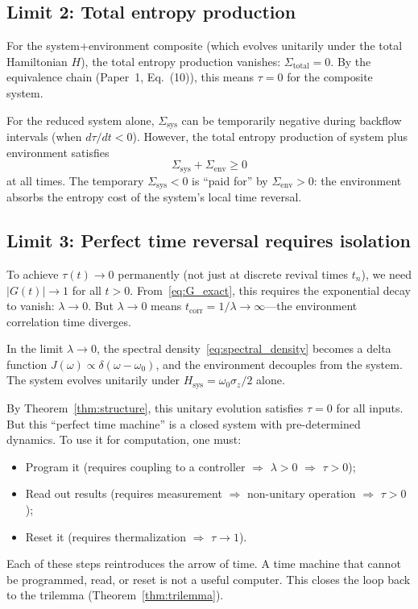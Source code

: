 \documentclass[prl,twocolumn,superscriptaddress,longbibliography]{revtex4-2}
\newcommand{\tauasym}{\tau}
\begin{document}
\subsection{Limit 2: Total entropy production}

For the system+environment composite (which evolves unitarily under
the total Hamiltonian $H$), the total entropy production vanishes:
$\Sigma_{\mathrm{total}} = 0$.  By the equivalence chain
(Paper~1, Eq.~(10)), this means $\tauasym = 0$ for the composite
system.

For the reduced system alone, $\Sigma_{\mathrm{sys}}$ can be
temporarily negative during backflow intervals (when $d\tauasym/dt < 0$).
However, the total entropy production of system plus environment
satisfies
\begin{equation}
\Sigma_{\mathrm{sys}} + \Sigma_{\mathrm{env}} \geq 0
\end{equation}
at all times.  The temporary $\Sigma_{\mathrm{sys}} < 0$ is
``paid for'' by $\Sigma_{\mathrm{env}} > 0$: the environment
absorbs the entropy cost of the system's local time reversal.

\subsection{Limit 3: Perfect time reversal requires isolation}

To achieve $\tauasym(t) \to 0$ permanently (not just at discrete
revival times $t_n$), we need $|G(t)| \to 1$ for all $t > 0$.
From~\eqref{eq:G_exact}, this requires the exponential decay to
vanish: $\lambda \to 0$.  But $\lambda \to 0$ means
$t_{\mathrm{corr}} = 1/\lambda \to \infty$---the environment
correlation time diverges.

In the limit $\lambda \to 0$, the spectral density~\eqref{eq:spectral_density}
becomes a delta function $J(\omega) \propto \delta(\omega - \omega_0)$,
and the environment decouples from the system.  The system evolves
unitarily under $H_{\mathrm{sys}} = \omega_0 \sigma_z / 2$ alone.

By Theorem~\ref{thm:structure}, this unitary evolution satisfies
$\tauasym = 0$ for all inputs.  But this ``perfect time machine''
is a closed system with pre-determined dynamics.  To use it for
computation, one must:
\begin{itemize}
\item Program it (requires coupling to a controller $\Rightarrow$
  $\lambda > 0$ $\Rightarrow$ $\tauasym > 0$);
\item Read out results (requires measurement $\Rightarrow$
  non-unitary operation $\Rightarrow$ $\tauasym > 0$);
\item Reset it (requires thermalization $\Rightarrow$
  $\tauasym \to 1$).
\end{itemize}
Each of these steps reintroduces the arrow of time.  A time machine
that cannot be programmed, read, or reset is not a useful computer.
This closes the loop back to the trilemma (Theorem~\ref{thm:trilemma}).
\end{document}
